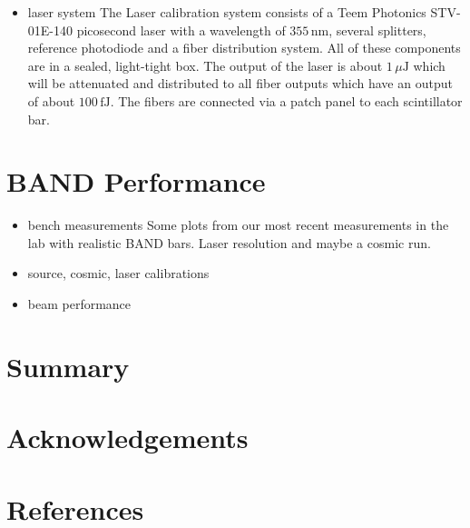 \documentclass[review]{elsarticle}
\begin{document}
\begin{itemize}
\item laser system
The Laser calibration system consists of a Teem Photonics STV-01E-140 picosecond laser with a wavelength of $355\,\mathrm{nm}$, several splitters, reference photodiode and a fiber distribution system. All of these components are in a sealed, light-tight box. The output of the laser is about $1\,\mu\mathrm{J}$ which will be attenuated and distributed to all fiber outputs which have an output of about $100\,\mathrm{fJ}$. The fibers are connected via a patch panel to each scintillator bar. 

\end{itemize}




\section{BAND Performance}

\begin{itemize}
\item bench measurements
Some plots from our most recent measurements in the lab with realistic BAND bars. Laser resolution and maybe a cosmic run.

\item source, cosmic, laser calibrations
\item beam performance
\end{itemize}






\section{Summary}


\section{Acknowledgements}


\section*{References}

\end{document}
